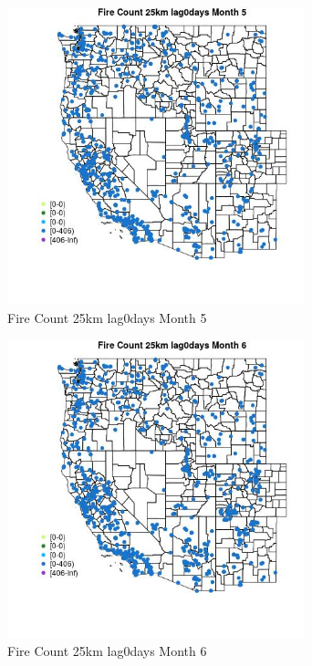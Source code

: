 \begin{figure} 
\centering  
\includegraphics[width=0.77\textwidth]{Code_Outputs/Report_ML_input_PM25_Step4_part_f_de_duplicated_aveswNAs_MapObsMo5Fire_Count_25km_lag0days.jpg} 
\caption{\label{fig:Report_ML_input_PM25_Step4_part_f_de_duplicated_aveswNAsMapObsMo5Fire_Count_25km_lag0days}Fire Count 25km lag0days Month 5} 
\end{figure} 
 

\begin{figure} 
\centering  
\includegraphics[width=0.77\textwidth]{Code_Outputs/Report_ML_input_PM25_Step4_part_f_de_duplicated_aveswNAs_MapObsMo6Fire_Count_25km_lag0days.jpg} 
\caption{\label{fig:Report_ML_input_PM25_Step4_part_f_de_duplicated_aveswNAsMapObsMo6Fire_Count_25km_lag0days}Fire Count 25km lag0days Month 6} 
\end{figure} 
 

